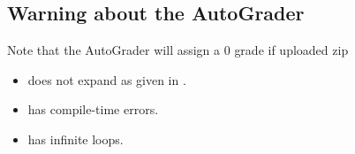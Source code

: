 \subsection{Warning about the AutoGrader}
\label{sec:app:warnAutoGrader}

Note that the AutoGrader will assign a 0 grade 
if uploaded zip 

\begin{itemize}[nosep] 
	
	\item does not expand as given in .
	
	\item has compile-time errors.
	
	\item has infinite loops.
	
\end{itemize}

